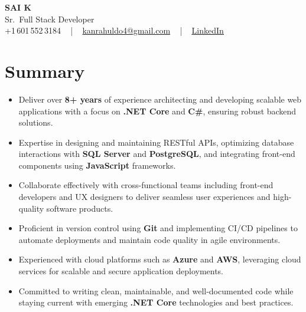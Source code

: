 \documentclass[letterpaper,11pt]{article}
\newcommand{\resumeItem}[1]{
  \item\footnotesize{
    {#1 \vspace{-2pt}}
  }
}
\newcommand{\resumeItemListStart}{\begin{itemize}[leftmargin=*]}
\newcommand{\resumeItemListEnd}{\end{itemize}\vspace{-5pt}}
\begin{document}
\begin{center}
    {\fontsize{14pt}{12pt}\selectfont \textbf{\MakeUppercase{Sai K}}}\\ \vspace{2pt}
    \fontsize{10pt}{12pt}\selectfont Sr.\ Full Stack Developer\\ \vspace{2pt}
    \fontsize{10pt}{12pt}\selectfont +1\,601\,552\,3184 ~ | ~
    \href{mailto:kanrahuldo4@gmail.com}{kanrahuldo4@gmail.com} ~ | ~
    \href{https://www.linkedin.com/in/srrrk/}{\color{blue}\underline{LinkedIn}}
    \vspace{-10pt}
\end{center}

\section{Summary}
\fontsize{9pt}{10pt}\selectfont
\resumeItemListStart
  \resumeItem{Deliver over \textbf{8+ years} of experience architecting and developing scalable web applications with a focus on \textbf{.NET Core} and \textbf{C\#}, ensuring robust backend solutions.}
  \resumeItem{Expertise in designing and maintaining RESTful APIs, optimizing database interactions with \textbf{SQL Server} and \textbf{PostgreSQL}, and integrating front-end components using \textbf{JavaScript} frameworks.}
  \resumeItem{Collaborate effectively with cross-functional teams including front-end developers and UX designers to deliver seamless user experiences and high-quality software products.}
  \resumeItem{Proficient in version control using \textbf{Git} and implementing CI/CD pipelines to automate deployments and maintain code quality in agile environments.}
  \resumeItem{Experienced with cloud platforms such as \textbf{Azure} and \textbf{AWS}, leveraging cloud services for scalable and secure application deployments.}
  \resumeItem{Committed to writing clean, maintainable, and well-documented code while staying current with emerging \textbf{.NET Core} technologies and best practices.}
\resumeItemListEnd
\vspace{-6pt}

\end{document}

